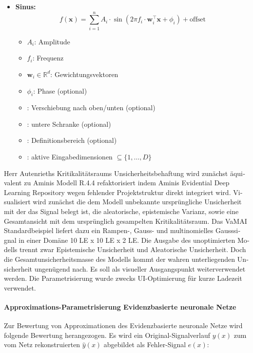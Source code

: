 \begin{otherlanguage}{ngerman}
\begin{itemize}
  \item \textbf{Sinus:}
    \[
    f(\mathbf{x}) = \sum_{i=1}^{n} A_i \cdot \sin(2\pi f_i \cdot \mathbf{w}_i^\top \mathbf{x} + \phi_i) + \text{offset}
    \]
    \begin{itemize}
      \item $A_i$: Amplitude
      \item $f_i$: Frequenz
      \item $\mathbf{w}_i \in \mathbb{R}^d$: Gewichtungsvektoren
      \item $\phi_i$: Phase (optional)
      \item {}: Verschiebung nach oben/unten (optional)
      \item {}: untere Schranke (optional)
      \item {}: Definitionsbereich (optional)
      \item {}: aktive Eingabedimensionen $\subseteq \{1, \dots, D\}$
    \end{itemize}
\end{itemize}



Herr Autenrieths Kritikalitätsraums Unsicherheitsbehaftung wird zunächst äquivalent zu Aminis Modell R.4.4 refaktorisiert indem Aminis \glqq{}Evidential Deep Learning\grqq{} Repository wegen fehlender Projektstruktur direkt integriert wird. Visualisiert wird zunächst die dem Modell unbekannte ursprüngliche Unsicherheit mit der das Signal belegt ist, die aleatorische, epistemische Varianz, sowie eine Gesamtansicht mit dem ursprünglich gesampelten Kritikalitätsraum. Das VaMAI Standardbeispiel liefert dazu ein Rampen-, Gauss- und multinomielles Gausssignal in einer Domäne 10 LE x 10 LE x 2 LE. Die Ausgabe des unoptimierten Modells trennt zwar \gls{Epistemische Unsicherheit} und \gls{Aleatorische Unsicherheit}. Doch die Gesamtunsicherheitsmasse des Modells kommt der wahren unterliegenden Unsicherheit ungenügend nach. Es soll als visueller Ausgangspunkt weiterverwendet werden. Die Parametrisierung wurde zwecks UI-Optimierung für kurze Ladezeit verwendet.



\paragraph{Approximations-Parametrisierung \gls{Evidenzbasierte neuronale Netze}} Zur Bewertung von Approximationen des \gls{Evidenzbasierte neuronale Netze} wird folgende Bewertung herangezogen. %
Es wird ein Original-Signalverlauf $y(x)$ zum vom Netz rekonstruierten $\hat{y}(x)$ abgebildet als Fehler-Signal $e(x)$: 


\end{otherlanguage}
